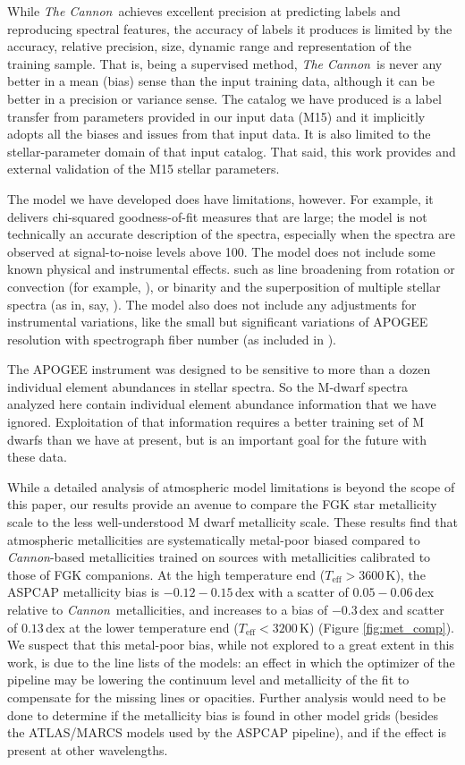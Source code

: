 \documentclass[twocolumn]{aastex62}
\newcommand{\thecannon}{\textsl{The Cannon}}
\newcommand{\cannon}{\textsl{Cannon}}
\newcommand{\teff}{T_{\mathrm{eff}}}
\begin{document}
While \thecannon\ achieves excellent precision at predicting labels
and reproducing spectral features, the
accuracy of labels it produces is limited by
the accuracy, relative precision, size, dynamic range and
representation of the training sample.
That is, being a supervised method, \thecannon\ is never any better in a mean (bias) sense than the input training data, although it can be better in a precision or variance sense.
The catalog we have produced is a label transfer from parameters provided
in our input data (M15) and it implicitly adopts all the biases and
issues from that input data.
It is also limited to the stellar-parameter domain of that input catalog.
That said, this work provides and external validation of the M15 stellar parameters.

The model we have developed does have limitations, however.
For example, it delivers chi-squared goodness-of-fit measures that
are large; the model is not technically an accurate description of the spectra,
especially when the spectra are observed at signal-to-noise levels above 100.
The model does not include some known physical and instrumental effects.
such as line broadening from rotation or
convection (for example, \citealt{Behmard2019}), 
or binarity and the superposition of multiple
stellar spectra (as in, say, \citealt{ElBadry:2018}).
The model also does not include any adjustments for instrumental variations, like 
the small but significant variations of APOGEE resolution with
spectrograph fiber number (as included in \citealt{Ness2018}).

The APOGEE instrument was designed to be sensitive to more than
a dozen individual element abundances in stellar spectra.
So the M-dwarf spectra analyzed here contain individual element abundance
information that we have ignored.
Exploitation of that information requires a better training set of M dwarfs than
we have at present, but is an important goal for the future with these data.

While a detailed analysis of atmospheric model limitations is beyond the scope of this paper, 
our results provide an avenue to compare the FGK star metallicity scale 
to the less well-understood M dwarf metallicity scale.
These results find that atmospheric metallicities are systematically metal-poor biased
compared to \cannon-based metallicities trained on sources with metallicities calibrated
to those of FGK companions. 
At the high temperature end ($\teff > 3600$\,K), the ASPCAP metallicity bias is $-0.12-0.15\,$dex with a scatter of $0.05-0.06\,$dex relative to \cannon\ metallicities, and increases to a bias of $-0.3\,$dex and scatter of $0.13\,$dex at the lower temperature end ($\teff < 3200$\,K) (Figure \ref{fig:met_comp}).
We suspect that this metal-poor bias, while not explored to a great extent in this work, is due 
to the line lists of the models: 
an effect in which the optimizer of the pipeline may be lowering the continuum level and metallicity of the fit to compensate for the missing lines or opacities.
Further analysis would need to be done to determine if the metallicity bias
is found in other model grids (besides the ATLAS/MARCS models used by the ASPCAP pipeline), 
and if the effect is present at other wavelengths.
\end{document}
